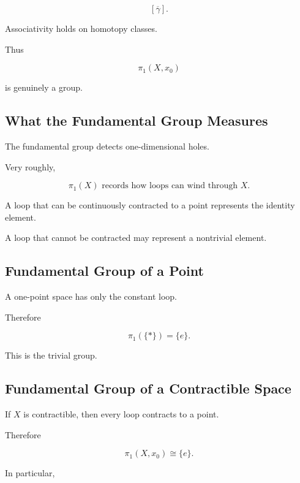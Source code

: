 \[
\boxed{
[\overline{\gamma}].
}
\]

Associativity holds on homotopy classes.

Thus

\[
\pi_1(X,x_0)
\]

is genuinely a group.

\subsection{What the Fundamental Group Measures}
\label{subsec:fundamental-group-meaning}

The fundamental group detects one-dimensional holes.

Very roughly,

\[
\boxed{
\pi_1(X)
\text{ records how loops can wind through }X.
}
\]

A loop that can be continuously contracted to a point represents the
identity element.

A loop that cannot be contracted may represent a nontrivial element.

\subsection{Fundamental Group of a Point}
\label{subsec:fundamental-group-point}

A one-point space has only the constant loop.

Therefore

\[
\boxed{
\pi_1(\{*\})
=
\{e\}.
}
\]

This is the trivial group.

\subsection{Fundamental Group of a Contractible Space}
\label{subsec:fundamental-group-contractible}

If \(X\) is contractible, then every loop contracts to a point.

Therefore

\[
\boxed{
\pi_1(X,x_0)
\cong
\{e\}.
}
\]

In particular,

